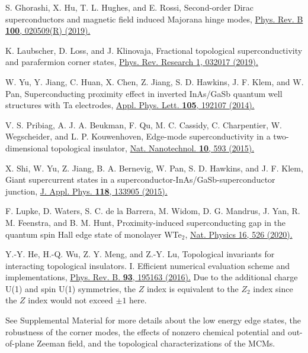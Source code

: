 \documentclass[twocolumn,prl,floatfix,citeautoscript,nofootinbib,superscriptaddress]{revtex4}
\begin{document}
\begin{thebibliography}{99}
 S. Ghorashi, X. Hu, T. L. Hughes, and E. Rossi,
Second-order Dirac superconductors and magnetic field induced Majorana hinge
modes, \href{https://doi.org/10.1103/PhysRevB.100.020509}{ Phys. Rev. B
\textbf{100}, 020509(R) (2019).}

 K. Laubscher, D. Loss, and J. Klinovaja, Fractional
topological superconductivity and parafermion corner states, \href{https://doi.org/10.1103/PhysRevResearch.1.032017}%
{Phys. Rev. Research 1, 032017 (2019).}

 W. Yu, Y. Jiang, C. Huan, X. Chen, Z. Jiang, S. D. Hawkins,
J. F. Klem, and W. Pan, Superconducting proximity effect in inverted
InAs/GaSb quantum well structures with Ta electrodes, \href{https://doi.org/10.1063/1.4901965}%
{\href{http://dx.doi.org/10.1103/PhysRevLett.114.096802}{ Appl. Phys. Lett.
\textbf{105}, 192107 (2014).}}

 V. S. Pribiag, A. J. A. Beukman, F. Qu, M. C. Cassidy,
C. Charpentier, W. Wegscheider, and L. P. Kouwenhoven, Edge-mode
superconductivity in a two-dimensional topological insulator, \href{http://dx.doi.org/10.1038/nnano.2015.86}%
{Nat. Nanotechnol. \textbf{10}, 593 (2015).}

 X. Shi, W. Yu, Z. Jiang, B. A. Bernevig, W. Pan, S. D.
Hawkins, and J. F. Klem, Giant supercurrent states in a
superconductor-InAs/GaSb-superconductor junction, \href{https://doi.org/10.1063/1.4932644}%
{J. Appl. Phys. \textbf{118}, 133905 (2015).}

 F. Lupke, D. Waters, S. C. de la Barrera, M. Widom, D.
G. Mandrus, J. Yan, R. M. Feenstra, and B. M. Hunt, Proximity-induced
superconducting gap in the quantum spin Hall edge state of monolayer \textrm{%
WTe}$_{2}$, \href{https://doi.org/10.1038/s41567-020-0816-x}{Nat. Physics
16, 526 (2020).}

 Y.-Y. He, H.-Q. Wu, Z. Y. Meng, and Z.-Y. Lu, Topological
invariants for interacting topological insulators. I. Efficient numerical
evaluation scheme and implementations, \href{http://dx.doi.org/10.1103/PhysRevB.93.195163}%
{Phys. Rev. B. \textbf{93}, 195163 (2016).} Due to the additional charge
U(1) and spin U(1) symmetries, the $Z$ index is equivalent to the $Z_{2}$
index since the $Z$ index would not exceed $\pm 1$ here.

 See Supplemental Material for more details about the low energy
edge states, the robustness of the corner modes, the effects of nonzero
chemical potential and out-of-plane Zeeman field, and the topological
characterizations of the MCMs.


\end{thebibliography}
\end{document}
